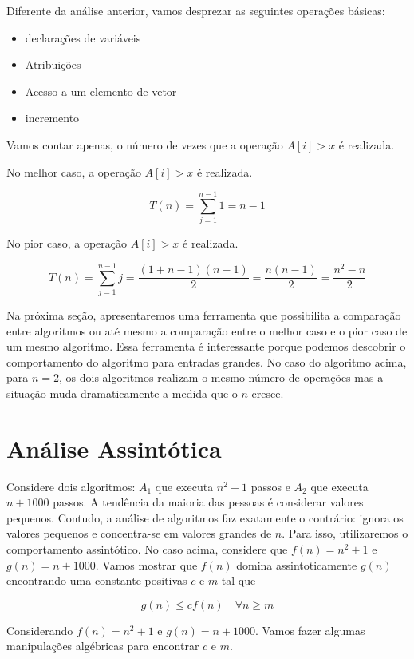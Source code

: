 Diferente da análise anterior, vamos desprezar as seguintes operações básicas: 

\begin{itemize}
    \item declarações de variáveis
    \item Atribuições
    \item Acesso a um elemento de vetor
    \item incremento
\end{itemize}

Vamos contar apenas, o número de vezes que a operação $A[i] > x$ é realizada. 

No melhor caso, a operação $A[i] > x$ é realizada. 

$$
T(n) = \sum_{j=1}^{n-1} 1 = n-1 
$$

No pior caso, a operação $A[i] > x$ é realizada. 

$$
T(n) = \sum_{j=1}^{n-1} j = \frac{(1 + n-1)(n-1)}{2} = \frac{n(n-1)}{2} = \frac{n^2-n}{2} 
$$

Na próxima seção, apresentaremos uma ferramenta que possibilita a comparação entre algoritmos ou até mesmo a comparação entre o melhor caso e o pior caso de um mesmo algoritmo. Essa ferramenta é interessante porque podemos descobrir o comportamento do algoritmo para entradas grandes. No caso do algoritmo acima, para $n=2$, os dois algoritmos realizam o mesmo número de operações mas a situação muda dramaticamente a medida que o $n$ cresce.







\section{Análise Assintótica}

Considere dois algoritmos: $A_1$ que executa $n^2 + 1$ passos e $A_2$ que executa $n + 1000$ passos. A tendência da maioria das pessoas é considerar valores pequenos. Contudo, a análise de algoritmos faz exatamente o contrário: ignora os valores pequenos e concentra-se em valores grandes de $n$. Para isso, utilizaremos o comportamento assintótico. No caso acima, considere que $f(n) = n^2 +1$ e $g(n) = n + 1000$. Vamos mostrar que $f(n)$ domina assintoticamente $g(n)$ encontrando uma constante positivas  $c$ e $m$ tal que 

$$
g(n) \leq c f(n) \quad \forall n \geq m
$$


Considerando $f(n) = n^2 + 1$ e $g(n) = n + 1000$. Vamos fazer algumas manipulações algébricas para encontrar $c$ e $m$.

